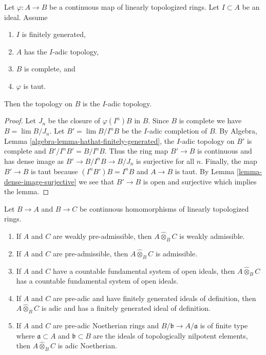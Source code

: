 \begin{lemma}
\label{lemma-taut-is-adic}
Let $\varphi : A \to B$ be a continuous map of linearly topologized rings.
Let $I \subset A$ be an ideal. Assume
\begin{enumerate}
\item $I$ is finitely generated,
\item $A$ has the $I$-adic topology,
\item $B$ is complete, and
\item $\varphi$ is taut.
\end{enumerate}
Then the topology on $B$ is the $I$-adic topology.
\end{lemma}

\begin{proof}
Let $J_n$ be the closure of $\varphi(I^n)B$ in $B$.
Since $B$ is complete we have $B = \lim B/J_n$.
Let $B' = \lim B/I^nB$ be the $I$-adic completion of $B$.
By Algebra, Lemma \ref{algebra-lemma-hathat-finitely-generated},
the $I$-adic topology on $B'$ is complete and
$B'/I^nB' = B/I^nB$. Thus the ring map $B' \to B$ is continuous
and has dense image as $B' \to B/I^nB \to B/J_n$ is surjective
for all $n$. Finally, the map $B' \to B$ is taut
because $(I^nB')B = I^nB$ and $A \to B$ is taut.
By Lemma \ref{lemma-dense-image-surjective} we see that $B' \to B$ is open
and surjective which implies the lemma.
\end{proof}

\begin{lemma}
\label{lemma-completed-tensor-product}
Let $B \to A$ and $B \to C$ be continuous homomorphisms of
linearly topologized rings.
\begin{enumerate}
\item If $A$ and $C$ are weakly pre-admissible, then
$A \widehat{\otimes}_B C$ is weakly admissible.
\item If $A$ and $C$ are pre-admissible, then
$A \widehat{\otimes}_B C$ is admissible.
\item If $A$ and $C$ have a countable fundamental system of open
ideals, then $A \widehat{\otimes}_B C$ has a countable fundamental
system of open ideals.
\item If $A$ and $C$ are pre-adic and have finitely generated ideals
of definition, then $A \widehat{\otimes}_B C$ is adic and has
a finitely generated ideal of definition.
\item If $A$ and $C$ are pre-adic Noetherian rings and
$B/\mathfrak b \to A/\mathfrak a$ is of finite type
where $\mathfrak a \subset A$ and $\mathfrak b \subset B$
are the ideals of topologically nilpotent elements, then
$A \widehat{\otimes}_B C$ is adic Noetherian.
\end{enumerate}
\end{lemma}

